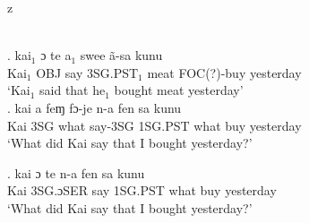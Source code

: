 z   \documentclass{assets/fieldnotes}
\begin{document}
\\

\exg. kai$_{1}$ ɔ te a$_{1}$ swee ã-sa kunu\\
Kai$_{1}$ OBJ say 3SG.PST$_{1}$ meat FOC(?)-buy yesterday\\
`Kai$_{1}$ said that he$_{1}$ bought meat yesterday' \\ 


\exg. kai a feɱ fɔ-je n-a fen sa kunu\\
Kai 3SG what say-3SG 1SG.PST what buy yesterday\\
`What did Kai say that I bought yesterday?' \\


\exg. kai ɔ te n-a fen sa kunu\\
Kai 3SG.ɔSER  say 1SG.PST  what buy yesterday\\
`What did Kai say that I bought yesterday?' \\
\end{document}
